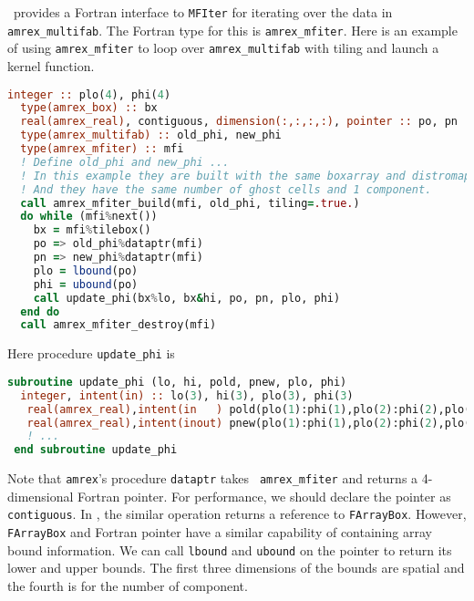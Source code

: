 {\amrex\ provides a Fortran interface to {\tt MFIter} for iterating
over the data in {\tt amrex\_multifab}.  The Fortran type for this is
{\tt amrex\_mfiter}.  Here is an example of using {\tt amrex\_mfiter}
to loop over {\tt amrex\_multifab} with tiling and launch a kernel
function.
\begin{lstlisting}[language=fortran]
  integer :: plo(4), phi(4)
  type(amrex_box) :: bx
  real(amrex_real), contiguous, dimension(:,:,:,:), pointer :: po, pn
  type(amrex_multifab) :: old_phi, new_phi
  type(amrex_mfiter) :: mfi
  ! Define old_phi and new_phi ...
  ! In this example they are built with the same boxarray and distromap.
  ! And they have the same number of ghost cells and 1 component.
  call amrex_mfiter_build(mfi, old_phi, tiling=.true.)
  do while (mfi%next())
    bx = mfi%tilebox()
    po => old_phi%dataptr(mfi)
    pn => new_phi%dataptr(mfi)
    plo = lbound(po)
    phi = ubound(po)
    call update_phi(bx%lo, bx&hi, po, pn, plo, phi)
  end do
  call amrex_mfiter_destroy(mfi)
\end{lstlisting}
Here procedure {\tt update\_phi} is
\begin{lstlisting}[language=fortran]
 subroutine update_phi (lo, hi, pold, pnew, plo, phi)
  integer, intent(in) :: lo(3), hi(3), plo(3), phi(3)
   real(amrex_real),intent(in   ) pold(plo(1):phi(1),plo(2):phi(2),plo(3):phi(3))
   real(amrex_real),intent(inout) pnew(plo(1):phi(1),plo(2):phi(2),plo(3):phi(3))
   ! ...
 end subroutine update_phi
\end{lstlisting}
Note that {\tt amrex\multifab}'s procedure {\tt dataptr} takes {\tt
  amrex\_mfiter} and returns a 4-dimensional Fortran pointer.  For
performance, we should declare the pointer as {\tt contiguous}.  In
\cpp, the similar operation returns a reference to {\tt FArrayBox}.
However, {\tt FArrayBox} and Fortran pointer have a similar capability
of containing array bound information.  We can call {\tt lbound} and
{\tt ubound} on the pointer to return its lower and upper bounds.  The
first three dimensions of the bounds are spatial and the fourth is for
the number of component.

}
